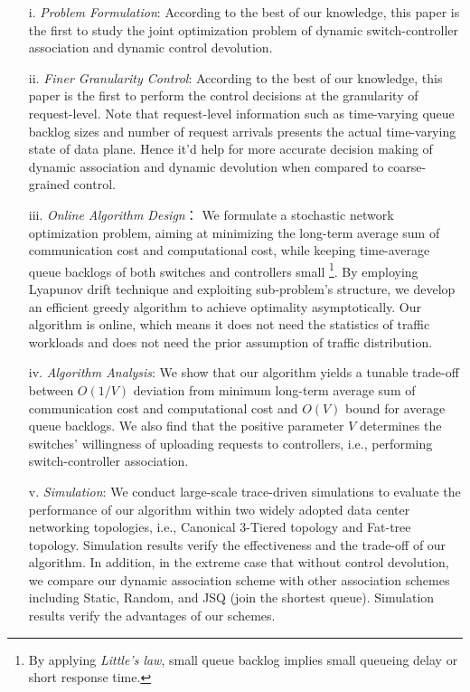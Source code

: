 \documentclass[10pt,journal,compsoc]{IEEEtran}
\begin{document}
 \begin{enumerate}
  \item[i.] \textit{Problem Formulation}: According to the best of our knowledge, this paper is the first to study the joint optimization problem of dynamic switch-controller association and dynamic control devolution.   
  \item[ii.] \textit{Finer Granularity Control}: According to the best of our knowledge, this paper is the first to perform the control decisions at the granularity of request-level. Note that request-level information such as time-varying queue backlog sizes and number of request arrivals presents the actual time-varying state of data plane. Hence it'd help for more accurate decision making of dynamic association and dynamic devolution when compared to coarse-grained control. 
  \item[iii.] \textit{Online Algorithm Design}： We formulate a stochastic network optimization problem, aiming at minimizing the long-term average sum of communication cost and computational cost, while keeping time-average queue backlogs of both switches and controllers small \footnote{By applying \emph{Little's law}, small queue backlog implies small queueing delay or short response time.}. By employing Lyapunov drift technique \cite{neely2010stochastic} and exploiting sub-problem’s structure, we develop an efficient greedy algorithm to achieve optimality asymptotically. Our algorithm is online, which means it does not need the statistics of traffic workloads and does not need the prior assumption of traffic distribution. 
  \item[iv.] \textit{Algorithm Analysis}: We show that our algorithm yields a tunable trade-off between $O(1/V)$ deviation from minimum long-term average sum of communication cost and computational cost and $O(V)$ bound for average queue backlogs. We also find that the positive parameter $V$ determines the switches' willingness of uploading requests to controllers, i.e., performing switch-controller association. 
  \item[v.] \textit{Simulation}: We conduct large-scale trace-driven simulations to evaluate the performance of our algorithm within two widely adopted data center networking topologies, i.e., Canonical 3-Tiered topology and Fat-tree topology. Simulation results verify the effectiveness and the trade-off of our algorithm. In addition, in the extreme case that without control devolution, we compare our dynamic association scheme with other association schemes including Static, Random, and JSQ (join the shortest queue). Simulation results verify the advantages of our schemes. 
 \end{enumerate}
 
\end{document}

